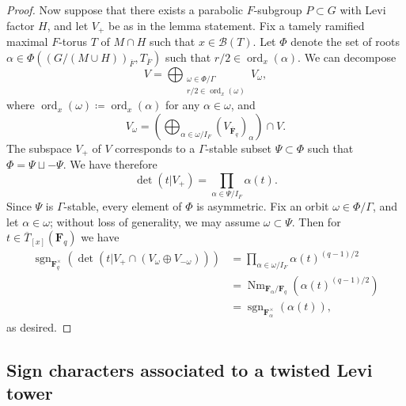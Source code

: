 \documentclass[reqno]{amsart}
\numberwithin{equation}{subsection}
\newcommand{\F}{\mathbf{F}}
\newcommand{\sgn}{\operatorname{sgn}}
\newcommand{\ol}[1]{\overline{#1}}
\newcommand\cB{\mathcal{B}}
\DeclareMathOperator{\ord}{ord}
\DeclareMathOperator{\Nm}{Nm}
\theoremstyle{remark}
\numberwithin{equation}{subsection}
\numberwithin{figure}{subsection}
\begin{document}
\begin{proof}
Now suppose that there exists a parabolic $F$-subgroup $P \subset G$ with Levi factor $H$, and let $V_+$ be as in the lemma statement. Fix a tamely ramified maximal $F$-torus $T$ of $M \cap H$ such that $x \in \cB(T)$. Let $\Phi$ denote the set of roots $\alpha \in \Phi((G/(M \cup H))_{\ol F}, T_{\ol F})$ such that $r/2 \in \ord_x(\alpha)$. We can decompose
\[
V = \bigoplus_{\substack{\omega \in \Phi/\Gamma \\ r/2 \in \ord_x(\omega)}} V_\omega,
\]
where $\ord_x(\omega) \coloneqq \ord_x(\alpha)$ for any $\alpha \in \omega$, and
\[
V_\omega = \left(\bigoplus_{\alpha \in \omega/I_F} (V_{\ol\F_q})_\alpha\right) \cap V.
\]
The subspace $V_+$ of $V$ corresponds to a $\Gamma$-stable subset $\Psi \subset \Phi$ such that $\Phi = \Psi \sqcup -\Psi$. We have therefore
\[
\det(t|V_+) = \prod_{\alpha \in \Psi/I_F} \alpha(t).
\]
Since $\Psi$ is $\Gamma$-stable, every element of $\Phi$ is asymmetric. Fix an orbit $\omega \in \Phi/\Gamma$, and let $\alpha \in \omega$; without loss of generality, we may assume $\omega \subset \Psi$. Then for $t \in \ol T_{[x]}(\F_q)$ we have
\begin{align*}
\sgn_{\F_q^\times}(\det(t|V_+ \cap (V_\omega \oplus V_{-\omega}))) &= \prod_{\alpha \in \omega/I_F} \alpha(t)^{(q-1)/2} \\
    &= \Nm_{\F_\alpha/\F_q}(\alpha(t)^{(q-1)/2}) \\
    &= \sgn_{\F_\alpha^\times}(\alpha(t)),
\end{align*}
as desired.
\end{proof}





\subsection{Sign characters associated to a twisted Levi tower}\label{sssec:eps-chars-descent-Levi}
\end{document}

